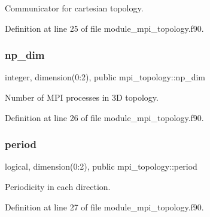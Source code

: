 Communicator for cartesian topology. 



Definition at line 25 of file module\+\_\+mpi\+\_\+topology.\+f90.

\mbox{\label{namespacempi__topology_ac837e97cb4896a72d94eb7a9f12d6682}} 
\subsubsection{\texorpdfstring{np\_dim}{np\_dim}}
{\footnotesize\ttfamily integer, dimension(0\+:2), public mpi\+\_\+topology\+::np\+\_\+dim}



Number of M\+PI processes in 3D topology. 



Definition at line 26 of file module\+\_\+mpi\+\_\+topology.\+f90.

\mbox{\label{namespacempi__topology_ac24cb383bdfbdf566165cf78b03677aa}} 
\subsubsection{\texorpdfstring{period}{period}}
{\footnotesize\ttfamily logical, dimension(0\+:2), public mpi\+\_\+topology\+::period}



Periodicity in each direction. 



Definition at line 27 of file module\+\_\+mpi\+\_\+topology.\+f90.

